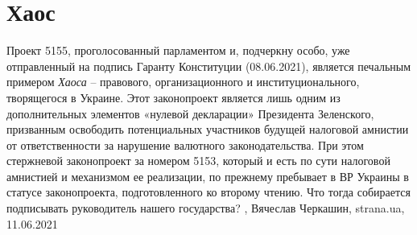  
 
 
 
 
\chapter{Хаос}
\label{sec:slova.haos}

Проект 5155, проголосованный парламентом и, подчеркну особо, уже отправленный
на подпись Гаранту Конституции (08.06.2021), является печальным примером \emph{Хаоса}
– правового, организационного и институционального, творящегося в Украине. Этот
законопроект является лишь одним из дополнительных элементов «нулевой
декларации» Президента Зеленского, призванным освободить потенциальных
участников будущей налоговой амнистии от ответственности за нарушение валютного
законодательства. При этом стержневой законопроект за номером 5153, который и
есть по сути налоговой амнистией и механизмом ее реализации, по прежнему
пребывает в ВР Украины в статусе законопроекта, подготовленного ко второму
чтению. Что тогда собирается подписывать руководитель нашего государства?
, Вячеслав Черкашин, strana.ua, 11.06.2021

